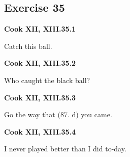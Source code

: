 \subsection*{Exercise 35}

\par\begin{minipage}{\linewidth}\raggedright
\textbf{Cook XII, XIII.35.1}

Catch this ball.

\end{minipage}\par\addvspace{4pt}

\par\begin{minipage}{\linewidth}\raggedright
\textbf{Cook XII, XIII.35.2}

Who caught the black ball?

\end{minipage}\par\addvspace{4pt}

\par\begin{minipage}{\linewidth}\raggedright
\textbf{Cook XII, XIII.35.3}

Go the way that (87. d) you came.

\end{minipage}\par\addvspace{4pt}

\par\begin{minipage}{\linewidth}\raggedright
\textbf{Cook XII, XIII.35.4}

I never played better than I did to-day.

\end{minipage}\par\addvspace{4pt}

